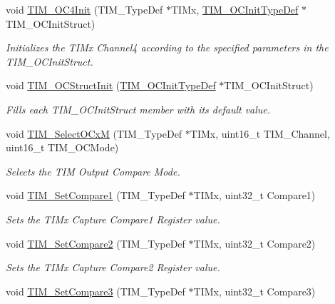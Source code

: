\begin{DoxyCompactItemize}
void \hyperlink{group___t_i_m___group2_ga64571ebbb58cac39a9e760050175f11c}{T\-I\-M\-\_\-\-O\-C4\-Init} (T\-I\-M\-\_\-\-Type\-Def $\ast$T\-I\-Mx, \hyperlink{struct_t_i_m___o_c_init_type_def}{T\-I\-M\-\_\-\-O\-C\-Init\-Type\-Def} $\ast$T\-I\-M\-\_\-\-O\-C\-Init\-Struct)
\begin{DoxyCompactList}\small\item\em Initializes the T\-I\-Mx Channel4 according to the specified parameters in the T\-I\-M\-\_\-\-O\-C\-Init\-Struct. \end{DoxyCompactList}\item 
void \hyperlink{group___t_i_m___group2_ga394683c78ae02837882e36014e11643e}{T\-I\-M\-\_\-\-O\-C\-Struct\-Init} (\hyperlink{struct_t_i_m___o_c_init_type_def}{T\-I\-M\-\_\-\-O\-C\-Init\-Type\-Def} $\ast$T\-I\-M\-\_\-\-O\-C\-Init\-Struct)
\begin{DoxyCompactList}\small\item\em Fills each T\-I\-M\-\_\-\-O\-C\-Init\-Struct member with its default value. \end{DoxyCompactList}\item 
void \hyperlink{group___t_i_m___group2_ga83ea0af5a7c1af521236ce5e4d2c42b0}{T\-I\-M\-\_\-\-Select\-O\-Cx\-M} (T\-I\-M\-\_\-\-Type\-Def $\ast$T\-I\-Mx, uint16\-\_\-t T\-I\-M\-\_\-\-Channel, uint16\-\_\-t T\-I\-M\-\_\-\-O\-C\-Mode)
\begin{DoxyCompactList}\small\item\em Selects the T\-I\-M Output Compare Mode. \end{DoxyCompactList}\item 
void \hyperlink{group___t_i_m___group2_ga48631e66c32bb905946664f4722b2546}{T\-I\-M\-\_\-\-Set\-Compare1} (T\-I\-M\-\_\-\-Type\-Def $\ast$T\-I\-Mx, uint32\-\_\-t Compare1)
\begin{DoxyCompactList}\small\item\em Sets the T\-I\-Mx Capture Compare1 Register value. \end{DoxyCompactList}\item 
void \hyperlink{group___t_i_m___group2_ga3de36754f3ba5d46b9ef2bf8e77575c7}{T\-I\-M\-\_\-\-Set\-Compare2} (T\-I\-M\-\_\-\-Type\-Def $\ast$T\-I\-Mx, uint32\-\_\-t Compare2)
\begin{DoxyCompactList}\small\item\em Sets the T\-I\-Mx Capture Compare2 Register value. \end{DoxyCompactList}\item 
void \hyperlink{group___t_i_m___group2_gac372fbbbbc20329802659dd6c6b4e051}{T\-I\-M\-\_\-\-Set\-Compare3} (T\-I\-M\-\_\-\-Type\-Def $\ast$T\-I\-Mx, uint32\-\_\-t Compare3)

\end{DoxyCompactItemize}
